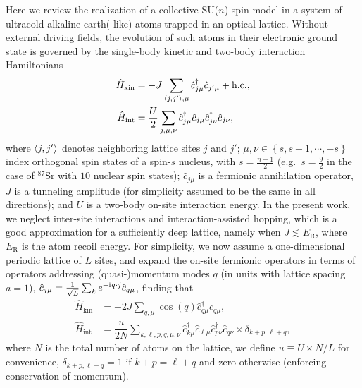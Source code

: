 \documentclass[aps,pra,nofootinbib,twocolumn,superscriptaddress]{revtex4-2}
\renewcommand{\t}{\text} %
\newcommand{\f}[2]{\dfrac{#1}{#2}} %
\newcommand{\p}[1]{\left(#1\right)} %
\renewcommand{\set}[1]{\left\{#1\right\}} %
\newcommand{\bk}{\braket} %
\renewcommand{\i}{\mathrm{i}\mkern1mu} %
\newcommand{\1}{\mathds{1}}
\renewcommand{\c}{\hat c}
\renewcommand{\H}{\hat H}
\begin{document}
Here we review the realization of a collective SU($n$) spin model in a system of ultracold alkaline-earth(-like) atoms trapped in an optical lattice.
Without external driving fields, the evolution of such atoms in their electronic ground state is governed by the single-body kinetic and two-body interaction Hamiltonians
\begin{align}
  \H_{\t{kin}}
  &= -J \sum_{\bk{j,j'},\mu} \c_{j\mu}^\dag \c_{j'\mu} + \t{h.c.}, \\
  \H_{\t{int}}
  &= \f{U}{2} \sum_{j,\mu,\nu}
  \c_{j\mu}^\dag \c_{j\mu} \c_{j\nu}^\dag \c_{j\nu},
\end{align}
where $\bk{j,j'}$ denotes neighboring lattice sites $j$ and $j'$; $\mu,\nu\in\set{s,s-1,\cdots,-s}$ index orthogonal spin states of a spin-$s$ nucleus, with $s=\frac{n-1}{2}$ (e.g.~$s=\frac{9}{2}$ in the case of ${}^{87}$Sr with $10$ nuclear spin states); $\c_{j\mu}$ is a fermionic annihilation operator, $J$ is a tunneling amplitude (for simplicity assumed to be the same in all directions); and $U$ is a two-body on-site interaction energy.
In the present work, we neglect inter-site interactions and interaction-assisted hopping, which is a good approximation for a sufficiently deep lattice, namely when $J\lesssim E_{\t{R}}$, where $E_{\t{R}}$ is the atom recoil energy.
For simplicity, we now assume a one-dimensional periodic lattice of $L$ sites, and expand the on-site fermionic operators in terms of operators addressing (quasi-)momentum modes $q$ (in units with lattice spacing $a=1$), $\c_{j\mu} = \frac1{\sqrt{L}} \sum_k e^{-\i q\cdot j} \c_{q\mu}$, finding that
\begin{align}
  \H_{\t{kin}}
  &= -2J\sum_{q,\mu} \cos\p{q} \c_{q\mu}^\dag \c_{q\mu}, \\
  \H_{\t{int}}
  &= \f{u}{2N} \sum_{k,\ell,p,q,\mu,\nu}
  \c_{k\mu}^\dag \c_{\ell\mu} \c_{p\nu}^\dag \c_{q\nu}
  \times \delta_{k+p,\ell+q},
  \label{eq:H_int_momenta}
\end{align}
where $N$ is the total number of atoms on the lattice, we define $u\equiv U\times N/L$ for convenience, $\delta_{k+p,\ell+q}=1$ if $k+p=\ell+q$ and zero otherwise (enforcing conservation of momentum).
\end{document}
